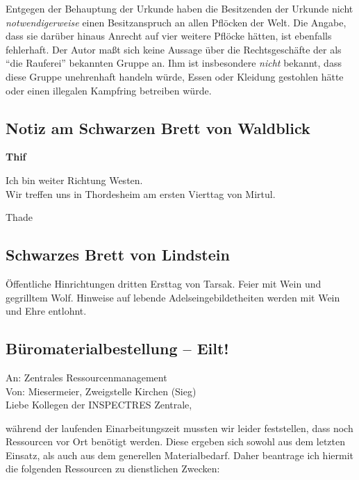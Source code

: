 Entgegen der Behauptung der Urkunde haben die Besitzenden der Urkunde nicht \textit{notwendigerweise} einen Besitzanspruch an allen Pflöcken der Welt.
Die Angabe, dass sie darüber hinaus Anrecht auf vier weitere Pflöcke hätten, ist ebenfalls fehlerhaft.
Der Autor maßt sich keine Aussage über die Rechtsgeschäfte der als \enquote{die Rauferei} bekannten Gruppe an.
Ihm ist insbesondere \textit{nicht} bekannt, dass diese Gruppe unehrenhaft handeln würde, Essen oder Kleidung gestohlen hätte oder einen illegalen Kampfring betreiben würde.


\subsection{Notiz am Schwarzen Brett von Waldblick}
\begin{center}
    \textbf{Thif}
\end{center}
\vspace{-1.5em}
\noindent
Ich bin weiter Richtung Westen. \\
Wir treffen uns in Thordesheim am ersten Vierttag von Mirtul.

Thade


\DeclareRobustCommand{\sxout}[1]{\texorpdfstring{\xout{#1}}{#1}}
\subsection{Schwarzes Brett von  Lindstein}
Öffentliche Hinrichtungen dritten Ersttag von Tarsak. Feier mit Wein und gegrilltem Wolf.
Hinweise auf lebende Adelseingebildetheiten werden mit Wein und Ehre entlohnt.


\subsection{Büromaterialbestellung -- Eilt!}
An: Zentrales Ressourcenmanagement \\
Von: Miesermeier, Zweigstelle Kirchen (Sieg) \\

\noindent
Liebe Kollegen der INSPECTRES Zentrale,

während der laufenden Einarbeitungszeit mussten wir leider feststellen, dass noch Ressourcen vor Ort benötigt werden.
Diese ergeben sich sowohl aus dem letzten Einsatz, als auch aus dem generellen Materialbedarf.
Daher beantrage ich hiermit die folgenden Ressourcen zu dienstlichen Zwecken:

